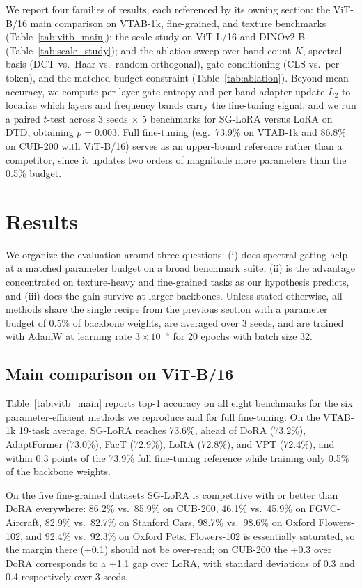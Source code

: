 \documentclass{article}
\begin{document}
We report four families of results, each referenced by its owning section: the ViT-B/16 main comparison on VTAB-1k, fine-grained, and texture benchmarks (Table~\ref{tab:vitb_main}); the scale study on ViT-L/16 and DINOv2-B (Table~\ref{tab:scale_study}); and the ablation sweep over band count $K$, spectral basis (DCT vs.\ Haar vs.\ random orthogonal), gate conditioning (CLS vs.\ per-token), and the matched-budget constraint (Table~\ref{tab:ablation}). Beyond mean accuracy, we compute per-layer gate entropy and per-band adapter-update $L_2$ to localize which layers and frequency bands carry the fine-tuning signal, and we run a paired $t$-test across 3 seeds $\times$ 5 benchmarks for SG-LoRA versus LoRA on DTD, obtaining $p=0.003$. Full fine-tuning (e.g.\ 73.9\% on VTAB-1k and 86.8\% on CUB-200 with ViT-B/16) serves as an upper-bound reference rather than a competitor, since it updates two orders of magnitude more parameters than the 0.5\% budget.

\section{Results}
We organize the evaluation around three questions: (i) does spectral gating help at a matched parameter budget on a broad benchmark suite, (ii) is the advantage concentrated on texture-heavy and fine-grained tasks as our hypothesis predicts, and (iii) does the gain survive at larger backbones. Unless stated otherwise, all methods share the single recipe from the previous section with a parameter budget of 0.5\% of backbone weights, are averaged over 3 seeds, and are trained with AdamW at learning rate $3\times10^{-4}$ for 20 epochs with batch size 32.

\subsection{Main comparison on ViT-B/16}

Table~\ref{tab:vitb_main} reports top-1 accuracy on all eight benchmarks for the six parameter-efficient methods we reproduce and for full fine-tuning. On the VTAB-1k 19-task average, SG-LoRA reaches 73.6\%, ahead of DoRA (73.2\%), AdaptFormer (73.0\%), FacT (72.9\%), LoRA (72.8\%), and VPT (72.4\%), and within 0.3 points of the 73.9\% full fine-tuning reference while training only 0.5\% of the backbone weights.

On the five fine-grained datasets SG-LoRA is competitive with or better than DoRA everywhere: 86.2\% vs.\ 85.9\% on CUB-200, 46.1\% vs.\ 45.9\% on FGVC-Aircraft, 82.9\% vs.\ 82.7\% on Stanford Cars, 98.7\% vs.\ 98.6\% on Oxford Flowers-102, and 92.4\% vs.\ 92.3\% on Oxford Pets. Flowers-102 is essentially saturated, so the margin there (+0.1) should not be over-read; on CUB-200 the +0.3 over DoRA corresponds to a +1.1 gap over LoRA, with standard deviations of 0.3 and 0.4 respectively over 3 seeds.
\end{document}
